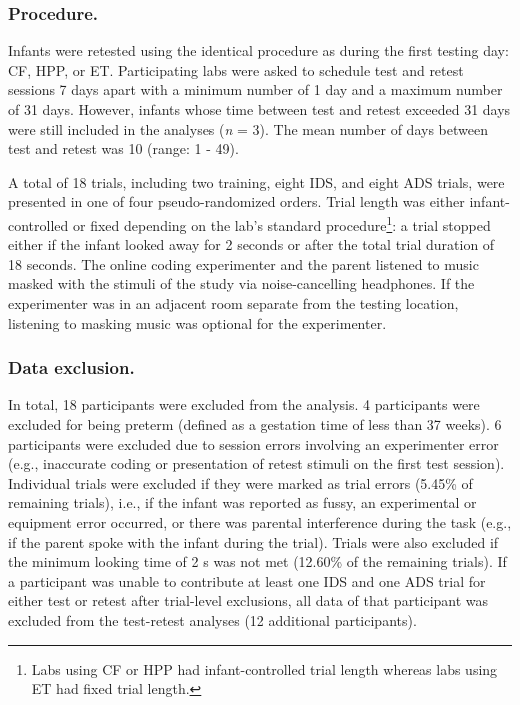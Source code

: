 \documentclass[
  english,
  man,floatsintext]{apa6}
\begin{document}
\hypertarget{procedure.}{%
\subsubsection{Procedure.}\label{procedure.}}

Infants were retested using the identical procedure as during the first testing day: CF, HPP, or ET.
Participating labs were asked to schedule test and retest sessions 7 days apart with a minimum number of 1 day and a maximum number of 31 days.
However, infants whose time between test and retest exceeded 31 days were still included in the analyses (\emph{n} = 3).
The mean number of days between test and retest was 10 (range: 1 - 49).

A total of 18 trials, including two training, eight IDS, and eight ADS trials, were presented in one of four pseudo-randomized orders.
Trial length was either infant-controlled or fixed depending on the lab's standard procedure\footnote{Labs using CF or HPP had infant-controlled trial length whereas labs using ET had fixed trial length.}: a trial stopped either if the infant looked away for 2 seconds or after the total trial duration of 18 seconds.
The online coding experimenter and the parent listened to music masked with the stimuli of the study via noise-cancelling headphones.
If the experimenter was in an adjacent room separate from the testing location, listening to masking music was optional for the experimenter.

\hypertarget{data-exclusion.}{%
\subsubsection{Data exclusion.}\label{data-exclusion.}}

In total, 18 participants were excluded from the analysis.
4 participants were excluded for being preterm (defined as a gestation time of less than 37 weeks).
6 participants were excluded due to session errors involving an experimenter error (e.g., inaccurate coding or presentation of retest stimuli on the first test session).
Individual trials were excluded if they were marked as trial errors (5.45\% of remaining trials), i.e., if the infant was reported as fussy, an experimental or equipment error occurred, or there was parental interference during the task (e.g., if the parent spoke with the infant during the trial).
Trials were also excluded if the minimum looking time of 2 s was not met (12.60\% of the remaining trials).
If a participant was unable to contribute at least one IDS and one ADS trial for either test or retest after trial-level exclusions, all data of that participant was excluded from the test-retest analyses (12 additional participants).
\end{document}
